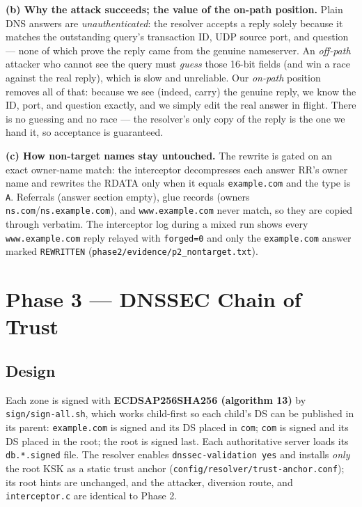 \documentclass[11pt,a4paper]{article}
\begin{document}
\textbf{(b) Why the attack succeeds; the value of the on-path position.} Plain DNS answers are
\emph{unauthenticated}: the resolver accepts a reply solely because it matches the outstanding
query's transaction ID, UDP source port, and question --- none of which prove the reply came from
the genuine nameserver. An \emph{off-path} attacker who cannot see the query must \emph{guess}
those 16-bit fields (and win a race against the real reply), which is slow and unreliable. Our
\emph{on-path} position removes all of that: because we see (indeed, carry) the genuine reply, we
know the ID, port, and question exactly, and we simply edit the real answer in flight. There is no
guessing and no race --- the resolver's only copy of the reply is the one we hand it, so acceptance
is guaranteed.

\textbf{(c) How non-target names stay untouched.} The rewrite is gated on an exact owner-name
match: the interceptor decompresses each answer RR's owner name and rewrites the RDATA only when
it equals \texttt{example.com} and the type is \texttt{A}. Referrals (answer section empty), glue
records (owners \texttt{ns.com}/\texttt{ns.example.com}), and \texttt{www.example.com} never match,
so they are copied through verbatim. The interceptor log during a mixed run shows every
\texttt{www.example.com} reply relayed with \texttt{forged=0} and only the \texttt{example.com}
answer marked \texttt{REWRITTEN} (\texttt{phase2/evidence/p2\_nontarget.txt}).



\section{Phase 3 --- DNSSEC Chain of Trust}

\subsection{Design}
Each zone is signed with \textbf{ECDSAP256SHA256 (algorithm 13)} by \texttt{sign/sign-all.sh},
which works child-first so each child's DS can be published in its parent:
\texttt{example.com} is signed and its DS placed in \texttt{com}; \texttt{com} is signed and its DS
placed in the root; the root is signed last. Each authoritative server loads its \texttt{db.*.signed}
file. The resolver enables \texttt{dnssec-validation yes} and installs \emph{only} the root KSK as a
static trust anchor (\texttt{config/resolver/trust-anchor.conf}); its root hints are unchanged, and
the attacker, diversion route, and \texttt{interceptor.c} are identical to Phase 2.
\end{document}
